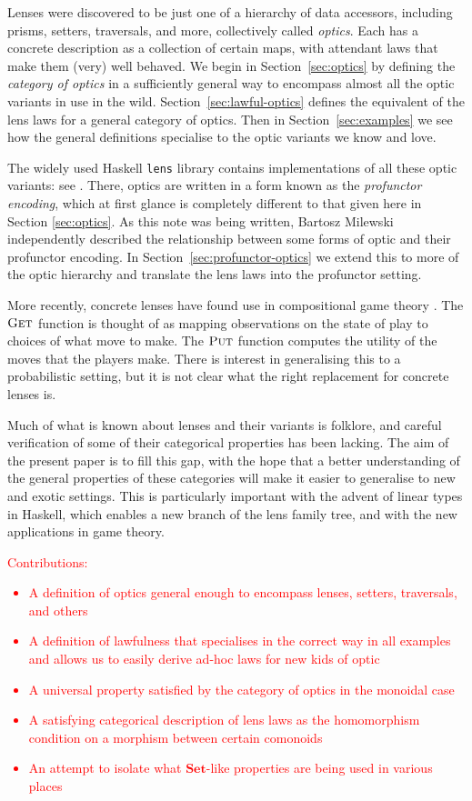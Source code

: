 \documentclass[11pt,a4paper]{article}
\theoremstyle{plain}
\theoremstyle{definition}
\newcommand{\lenslib}{\texttt{lens}}
\newcommand{\Set}{\mathbf{Set}}
\newcommand{\fget}{\textsc{Get}}
\newcommand{\fput}{\textsc{Put}}
\newcommand{\todo}[1]{\textcolor{red}{\small #1}}
\begin{document}
Lenses were discovered to be just one of a hierarchy of data accessors, including prisms, setters, traversals, and more, collectively called \emph{optics}. Each has a concrete description as a collection of certain maps, with attendant laws that make them (very) well behaved. We begin in Section~\ref{sec:optics} by defining the \emph{category of optics} in a sufficiently general way to encompass almost all the optic variants in use in the wild. Section~\ref{sec:lawful-optics} defines the equivalent of the lens laws for a general category of optics. Then in Section~\ref{sec:examples} we see how the general definitions specialise to the optic variants we know and love.

The widely used Haskell \lenslib{} library contains implementations of all these optic variants: see \cite{LensLibrary}. There, optics are written in a form known as the \emph{profunctor encoding}, which at first glance is completely different to that given here in Section \ref{sec:optics}. As this note was being written, Bartosz Milewski~\cite{ProfunctorOpticsPost} independently described the relationship between some forms of optic and their profunctor encoding. In Section~\ref{sec:profunctor-optics} we extend this to more of the optic hierarchy and translate the lens laws into the profunctor setting.

More recently, concrete lenses have found use in compositional game theory \cite{CompositionalGameTheory}. The $\fget$ function is thought of as mapping observations on the state of play to choices of what move to make. The $\fput$ function computes the utility of the moves that the players make. There is interest in generalising this to a probabilistic setting, but it is not clear what the right replacement for concrete lenses is.

Much of what is known about lenses and their variants is folklore, and careful verification of some of their categorical properties has been lacking. The aim of the present paper is to fill this gap, with the hope that a better understanding of the general properties of these categories will make it easier to generalise to new and exotic settings. This is particularly important with the advent of linear types in Haskell, which enables a new branch of the lens family tree, and with the new applications in game theory.

\todo{Contributions:
  \begin{itemize}
  \item A definition of optics general enough to encompass lenses, setters, traversals, and others
  \item A definition of lawfulness that specialises in the correct way in all examples and allows us to easily derive ad-hoc laws for new kids of optic
  \item A universal property satisfied by the category of optics in the monoidal case
  \item A satisfying categorical description of lens laws as the homomorphism condition on a morphism between certain comonoids
  \item An attempt to isolate what $\Set$-like properties are being used in various places
  \end{itemize}
}
\end{document}
